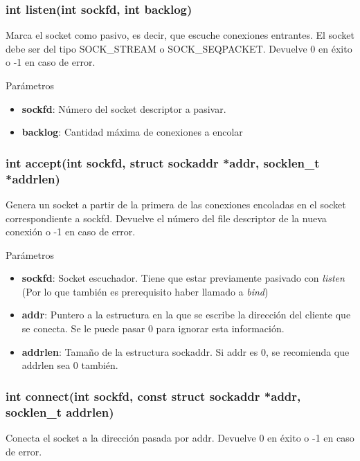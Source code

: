\documentclass[a4paper, twoside]{article}
\begin{document}
\subsubsection{int listen(int sockfd, int backlog)}
Marca el socket como pasivo, es decir, que escuche conexiones entrantes. El socket debe ser del tipo SOCK\_STREAM o SOCK\_SEQPACKET. Devuelve 0 en éxito o -1 en caso de error.

\begin{parametros*}{Parámetros}
	\begin{itemize}
		\item \textbf{sockfd}: Número del socket descriptor a pasivar.
		\item \textbf{backlog}: Cantidad máxima de conexiones a encolar
	\end{itemize}
\end{parametros*}

\subsubsection{int accept(int sockfd, struct sockaddr *addr, socklen\_t *addrlen)}
Genera un socket a partir de la primera de las conexiones encoladas en el socket correspondiente a sockfd. Devuelve el número del file descriptor de la nueva conexión o -1 en caso de error.

\begin{parametros*}{Parámetros}
	\begin{itemize}
		\item \textbf{sockfd}: Socket escuchador. Tiene que estar previamente pasivado con \emph{listen} (Por lo que también es prerequisito haber llamado a \emph{bind})
		\item \textbf{addr}: Puntero a la estructura en la que se escribe la dirección del cliente que se conecta. Se le puede pasar 0 para ignorar esta información.
		\item \textbf{addrlen}: Tamaño de la estructura sockaddr. Si addr es 0, se recomienda que addrlen sea 0 también.
	\end{itemize}
\end{parametros*}

\subsubsection{int connect(int sockfd, const struct sockaddr *addr, socklen\_t addrlen)}
Conecta el socket a la dirección pasada por addr. Devuelve 0 en éxito o -1 en caso de error.
\end{document}
